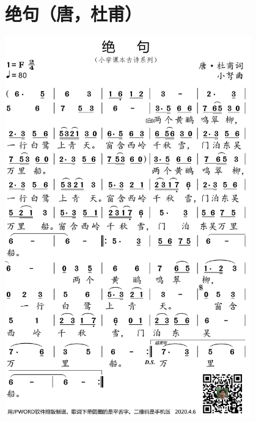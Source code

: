 \documentclass[cn,pad,twocol]{elegantbook}
\begin{document}
\section{绝句（唐，杜甫）}      \includegraphics[width=0.8\textwidth]{dongxiao/20200627-古诗-杜甫-绝句.jpg}   
\end{document}
